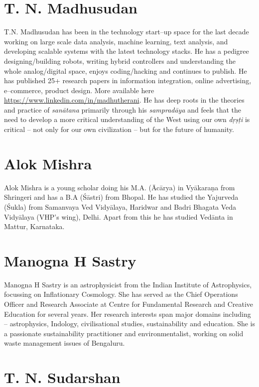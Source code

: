 \section*{T. N. Madhusudan}

T.N. Madhusudan has been in the technology start–up space for the last decade working on large scale data analysis, machine learning, text analysis, and developing scalable systems with the latest technology stacks. He has a pedigree designing/building robots, writing hybrid controllers and understanding the whole analog/digital space, enjoys coding/hacking and continues to publish. He has published 25+ research papers in information integration, online advertising, e–commerce, product design. More available here \url{https://www.linkedin.com/in/madhutherani}. He has deep roots in the theories and practice of \textit{sanātana} primarily through his \textit{sampradāya} and feels that the need to develop a more critical understanding of the West using our own \textit{dṛṣṭi} is critical – not only for our own civilization – but for the future of humanity.

\section*{Alok Mishra}

Alok Mishra is a young scholar doing his M.A. (Ācārya) in Vyākaraṇa from Shringeri and has a B.A (Śāstri) from Bhopal. He has studied the Yajurveda (Śukla) from Samanvaya Ved Vidyālaya, Haridwar and Badri Bhagata Veda Vidyālaya (VHP’s wing), Delhi. Apart from this he has studied Vedānta in Mattur, Karnataka.

\section*{Manogna H Sastry}

Manogna H Sastry is an astrophysicist from the Indian Institute of Astrophysics, focussing on Inflationary Cosmology. She has served as the Chief Operations Officer and Research Associate at Centre for Fundamental Research and Creative Education for several years. Her research interests span major domains including – astrophysics, Indology, civilisational studies, sustainability and education. She is a passionate sustainability practitioner and environmentalist, working on solid waste management issues of Bengaluru.

\section*{T. N. Sudarshan}

